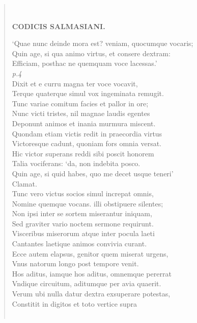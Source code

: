 \documentclass[11pt, a4paper]{report}
\begin{document}
\begin{verse}
        ﻿\pagebreak 
    \begin{center} \textbf{CODICIS SALMASIANI.} \end{center} \marginpar{[4]} ‘Quae nunc deinde mora est? veniam, quocumque vocaris; \\ Quin age, si qua animo virtus, et consere dextram: \\ Efficiam, posthac ne quemquam voce lacessas.’ \\ \textit{p.4} \\ Dixit et e curru magna ter voce vocavit, \\ Terque quaterque simul vox ingeminata remugit. \\ Tunc variae comitum facies et pallor in ore; \\ Nunc victi tristes, nil magnae laudis egentes \\ Deponunt animos et inania murmura miscent. \\ Quondam etiam victis redit in praecordia virtus \\ Victoresque cadunt, quoniam fors omnia versat. \\ Hic victor superans reddi sibi poscit honorem \\ Talia vociferans: ‘da, non indebita posco. \\ Quin age, si quid habes, quo me decet usque teneri’ \\ Clamat. \\ Tunc vero victus socios simul increpat omnis, \\ Nomine quemque vocans. illi obstipuere silentes; \\ Non ipsi inter se sortem miserantur iniquam, \\ Sed graviter vario noctem sermone requirunt. \\ Visceribus miserorum atque inter pocula laeti \\ Cantantes laetique animos convivia curant. \\ Ecce autem elapsus, genitor quem miserat urgens, \\ Vnus natorum longo post tempore venit. \\ Hos aditus, iamque hos aditus, omnemque pererrat \\ Vndique circuitum, aditumque per avia quaerit. \\ Verum ubi nulla datur dextra exsuperare potestas, \\  Constitit in digitos et toto vertice supra \\ 
        ﻿\pagebreak 

\end{verse}
\end{document}
